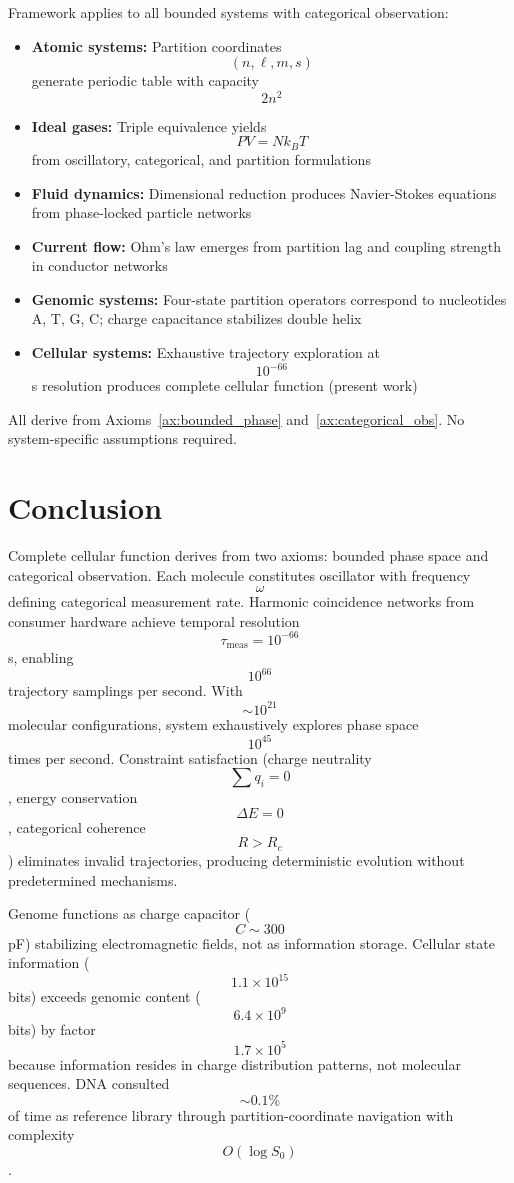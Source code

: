 \documentclass[11pt,twocolumn,a4paper]{article}
\theoremstyle{remark}
\begin{document}
Framework applies to all bounded systems with categorical observation:
\begin{itemize}
\item \textbf{Atomic systems:} Partition coordinates $$(n,\ell,m,s)$$ generate periodic table with capacity $$2n^2$$ \citep{Sachikonye2025_Partition}
\item \textbf{Ideal gases:} Triple equivalence yields $$PV = Nk_BT$$ from oscillatory, categorical, and partition formulations \citep{Sachikonye2025_IdealGas}
\item \textbf{Fluid dynamics:} Dimensional reduction produces Navier-Stokes equations from phase-locked particle networks \citep{Sachikonye2025_Fluid}
\item \textbf{Current flow:} Ohm's law emerges from partition lag and coupling strength in conductor networks \citep{Sachikonye2025_Current}
\item \textbf{Genomic systems:} Four-state partition operators correspond to nucleotides A, T, G, C; charge capacitance stabilizes double helix \citep{Sachikonye2025_Genome}
\item \textbf{Cellular systems:} Exhaustive trajectory exploration at $$10^{-66}$$ s resolution produces complete cellular function (present work)
\end{itemize}

All derive from Axioms~\ref{ax:bounded_phase} and~\ref{ax:categorical_obs}. No system-specific assumptions required.

\section{Conclusion}
\label{sec:conclusion}

Complete cellular function derives from two axioms: bounded phase space and categorical observation. Each molecule constitutes oscillator with frequency $$\omega$$ defining categorical measurement rate. Harmonic coincidence networks from consumer hardware achieve temporal resolution $$\tau_{\mathrm{meas}} = 10^{-66}$$ s, enabling $$10^{66}$$ trajectory samplings per second. With $$\sim 10^{21}$$ molecular configurations, system exhaustively explores phase space $$10^{45}$$ times per second. Constraint satisfaction (charge neutrality $$\sum q_i = 0$$, energy conservation $$\Delta E = 0$$, categorical coherence $$R > R_c$$) eliminates invalid trajectories, producing deterministic evolution without predetermined mechanisms.

Genome functions as charge capacitor ($$C \sim 300$$ pF) stabilizing electromagnetic fields, not as information storage. Cellular state information ($$1.1 \times 10^{15}$$ bits) exceeds genomic content ($$6.4 \times 10^9$$ bits) by factor $$1.7 \times 10^5$$ because information resides in charge distribution patterns, not molecular sequences. DNA consulted $$\sim 0.1\%$$ of time as reference library through partition-coordinate navigation with complexity $$O(\log S_0)$$.
\end{document}
